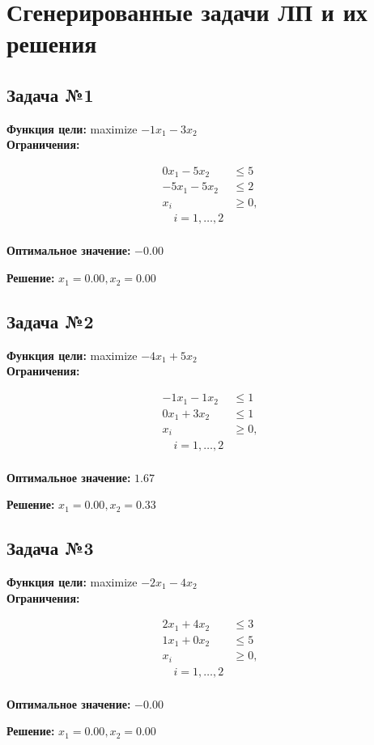 \documentclass[a4paper,12pt]{article}
\begin{document}
\section*{Сгенерированные задачи ЛП и их решения}

\subsection*{Задача №1}
\textbf{Функция цели: }
maximize $ -1x_{1} -3x_{2} $\\

\textbf{Ограничения:}

\[ \begin{aligned}
0x_{1} -5x_{2} &\le 5 \\ 
-5x_{1} -5x_{2} &\le 2 \\ 
x_i &\ge 0,\\ 
\quad i=1,\dots,2 \\ 
\end{aligned}\]

\textbf{Оптимальное значение: }$-0.00$

\textbf{Решение: }$x_{1}=0.00, x_{2}=0.00$



\subsection*{Задача №2}
\textbf{Функция цели: }
maximize $ -4x_{1} +5x_{2} $\\

\textbf{Ограничения:}

\[ \begin{aligned}
-1x_{1} -1x_{2} &\le 1 \\ 
0x_{1} +3x_{2} &\le 1 \\ 
x_i &\ge 0,\\ 
\quad i=1,\dots,2 \\ 
\end{aligned}\]

\textbf{Оптимальное значение: }$1.67$

\textbf{Решение: }$x_{1}=0.00, x_{2}=0.33$



\subsection*{Задача №3}
\textbf{Функция цели: }
maximize $ -2x_{1} -4x_{2} $\\

\textbf{Ограничения:}

\[ \begin{aligned}
2x_{1} +4x_{2} &\le 3 \\ 
1x_{1} +0x_{2} &\le 5 \\ 
x_i &\ge 0,\\ 
\quad i=1,\dots,2 \\ 
\end{aligned}\]

\textbf{Оптимальное значение: }$-0.00$

\textbf{Решение: }$x_{1}=0.00, x_{2}=0.00$
\end{document}
